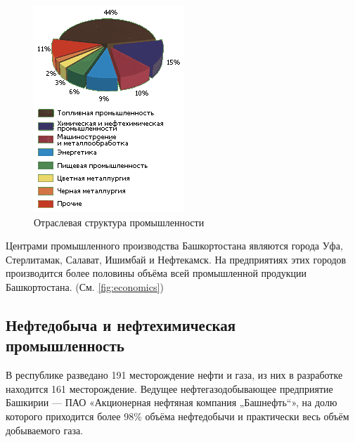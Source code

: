 \begin{figure}
\includegraphics[width=1\linewidth]{pics/sasha/promstruct}
\caption{Отраслевая структура промышленности}
\end{figure}
Центрами промышленного производства Башкортостана являются города Уфа, Стерлитамак, Салават, Ишимбай и Нефтекамск. На предприятиях этих городов производится более половины объёма всей промышленной продукции Башкортостана. (См. \ref{fig:economics})

\subsection{Нефтедобыча и нефтехимическая промышленность}

В республике разведано 191 месторождение нефти и газа, из них в разработке находится 161 месторождение. Ведущее нефтегазодобывающее предприятие Башкирии — ПАО «Акционерная нефтяная компания „Башнефть“», на долю которого приходится более 98\% объёма нефтедобычи и практически весь объём добываемого газа.


